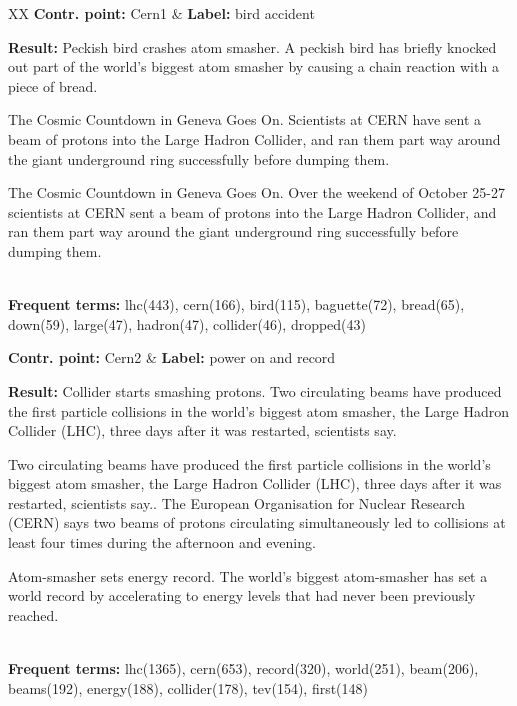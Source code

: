 
\begin{table*}[htbp]
	\centering
	\begin{tabularx}{\textwidth}{XX}
\hline
\textbf{Contr. point:} Cern1 & \textbf{Label:} bird accident\\
	{\textbf{Result:} Peckish bird crashes atom smasher. A peckish bird has
	briefly knocked out part of the world's biggest atom smasher by causing a
	chain reaction with a piece of bread.

The Cosmic Countdown in Geneva Goes On. Scientists at CERN have sent a beam of
protons into the Large Hadron Collider, and ran them part way around the giant
underground ring successfully before dumping them.

The Cosmic Countdown in Geneva Goes On. Over the weekend of October 25-27
scientists at CERN sent a beam of protons into the Large Hadron Collider, and
ran them part way around the giant underground ring successfully before dumping
them. } \\
{\textbf{Frequent terms:} lhc(443), cern(166), bird(115), baguette(72),
bread(65), down(59), large(47), hadron(47), collider(46), dropped(43)}\\
\hline

\textbf{Contr. point:} Cern2 & \textbf{Label:} power on and record \\
{\textbf{Result:}  
Collider starts smashing protons. Two circulating beams have produced the first
particle collisions in the world's biggest atom smasher, the Large Hadron
Collider (LHC), three days after it was restarted, scientists say.

Two circulating beams have produced the first particle collisions in the world's
biggest atom smasher, the Large Hadron Collider (LHC), three days after it was
restarted, scientists say.. The European Organisation for Nuclear Research
(CERN) says two beams of protons circulating simultaneously led to collisions at
least four times during the afternoon and evening.

Atom-smasher sets energy record. The world's biggest atom-smasher has set a
world record by accelerating to energy levels that had never been previously
reached.
} \\
{\textbf{Frequent terms:} lhc(1365), cern(653), record(320), world(251),
beam(206), beams(192), energy(188), collider(178), tev(154), first(148)} \\
\hline


\end{tabularx}
\end{table*}
